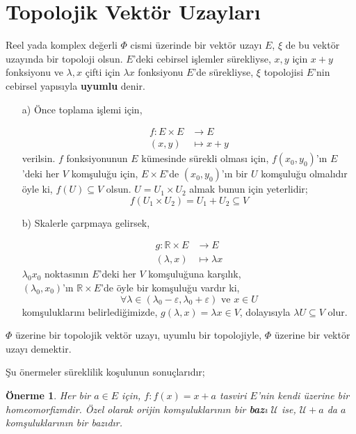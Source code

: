\documentclass[11pt]{article}
\theoremstyle{plain}
\newtheorem{proposition}{Önerme}
\theoremstyle{definition}
\theoremstyle{remark}
\numberwithin{equation}{section}
\renewcommand{\%}{{\small \%}}
\begin{document}
\section{Topolojik Vektör Uzayları}\label{tvu:intro}
Reel yada komplex değerli $\Phi$ cismi üzerinde bir vektör uzayı $E$, $\xi$ de bu vektör uzayında bir topoloji olsun. $E$'deki cebirsel işlemler sürekliyse, $x,y$ için $x+y$ fonksiyonu ve $\lambda, x$ çifti için $\lambda x$ fonksiyonu $E$'de sürekliyse, $\xi$ topolojisi $E$'nin cebirsel yapısıyla \textbf{uyumlu} denir.
\begin{itemize} 
\item[a)]Önce toplama işlemi için,

\begin{align*}
f:E\times E &\longrightarrow E\\
(x,y)&\longmapsto x+y
\end{align*}
verilsin. $f$ fonksiyonunun $E$ kümesinde sürekli olması için, $f(x_0 ,y_0)$'ın $E$'deki her $V$ komşuluğu için, $E\times E$'de $(x_0 ,y_0)$'ın bir $U$ komşuluğu olmalıdır öyle ki, $f(U)\subseteq V$ olsun. $U=U_1 \times U_2$ almak bunun için yeterlidir;\\
 \[f\left(U_1 \times U_2\right)=U_1 + U_2 \subseteq V\]

\item[b)] Skalerle çarpmaya gelirsek,

\begin{align*}
g:\mathbb{R}\times E &\longrightarrow E\\
\left(\lambda, x\right) &\longmapsto \lambda x
\end{align*}
$\lambda_0 x_0$ noktasının $E$'deki her $V$ komşuluğuna karşılık,\\
$\left(\lambda_0 ,x_0\right)$'ın $\mathbb{R}\times E$'de öyle bir komşuluğu vardır ki,\\
\[
\forall\lambda\in\left(\lambda_0 -\varepsilon,\lambda_0 +\varepsilon\right) \text{ ve } x\in U 
\]
komşuluklarını belirlediğimizde, $ g(\lambda,x)=\lambda x\in V$, dolayısıyla $\lambda U\subseteq V$ olur. \\[2pt]

\end{itemize}


$\Phi$ üzerine bir topolojik vektör uzayı, uyumlu bir topolojiyle, $\Phi$ üzerine bir vektör uzayı demektir.\newpage

Şu önermeler süreklilik koşulunun sonuçlarıdır;

\begin{proposition}
Her bir $a\in E$ için, $f:f(x)=x+a$ tasviri $E$'nin kendi üzerine bir homeomorfizmdir. Özel olarak orijin komşuluklarının bir \textbf{baz}ı $\mathscr{U}$ ise, $\mathscr{U}+a$ da $a$ komşuluklarının bir bazıdır.
\end{proposition}
\end{document}
